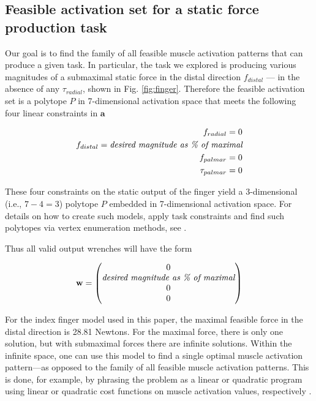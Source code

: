 \documentclass[10pt,letterpaper]{article}
\begin{document}
\subsection*{Feasible activation set for a static force production task}
Our goal is to find the family of all feasible muscle activation patterns that can produce a given task. In particular, the task we explored is producing various magnitudes of a submaximal static force in the distal direction $f_{distal}$ --- in the absence of any $\tau_{radial}$, shown  in Fig. \ref{fig:finger}. Therefore the feasible activation set is a polytope $P$ in 7-dimensional activation space that meets the following four linear constraints in $\textbf{a}$ \cite{Valero-Cuevas1998Large,valero-cuevas2015fundamentals,Valero-Cuevas2000Scaling}

\begin{eqnarray}
f_{radial} = 0 \\
f_{distal} = \emph{desired magnitude as \% of maximal} \\
f_{palmar} = 0 \\
\tau_{palmar} = 0
\end{eqnarray}

These four constraints on the static output of the finger yield a 3-dimensional (i.e., $7-4=3$) polytope $P$ embedded in 7-dimensional activation space.
For details on how to create such models, apply task constraints and find such polytopes via vertex enumeration methods, see \cite{Valero-Cuevas1998Large,valero-cuevas2015fundamentals}.

Thus all valid output wrenches will have the form

\begin{equation}
\label{eq:wa}
\textbf{w}= 
\begin{pmatrix}
0\\
\emph{desired magnitude as \% of maximal}\\
0\\
0
\end{pmatrix}
\end{equation}

For the index finger model used in this paper, the maximal feasible force in the distal direction is 28.81 Newtons. For the maximal force, there is only one solution, but with submaximal forces there are infinite solutions. Within the infinite space, one can use this model to find a single optimal muscle activation pattern---as opposed to the family of all feasible muscle activation patterns. This is done, for example, by phrasing the problem as a linear or quadratic program  using linear or quadratic cost functions on muscle activation values, respectively \cite{chvatal-LP,Valero-Cuevas1998Large,valero-cuevas2015fundamentals}. 
\end{document}
